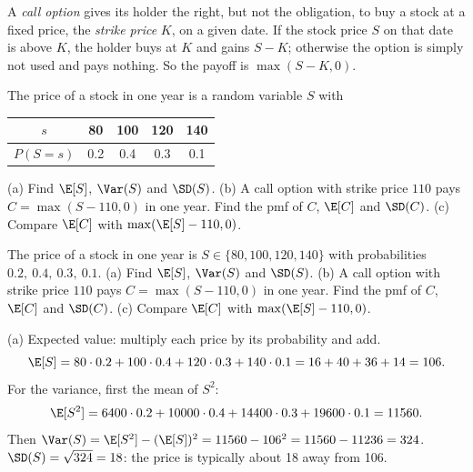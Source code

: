 
\begin{problem}
	\begin{context}
		A \emph{call option} gives its holder the right, but not the obligation,
		to buy a stock at a fixed price, the \emph{strike price} $K$, on a given
		date. If the stock price $S$ on that date is above $K$, the holder buys at
		$K$ and gains $S-K$; otherwise the option is simply not used and pays nothing. So the
		payoff is $\max(S-K,0)$.
	\end{context}
	The price of a stock in one year is a random variable $S$ with
	\begin{center}
		\begin{tabular}{c|cccc}
			$s$      & 80  & 100 & 120 & 140 \\\hline
			$P(S=s)$ & 0.2 & 0.4 & 0.3 & 0.1
		\end{tabular}
	\end{center}
	(a) Find $\E[S]$, $\Var(S)$ and $\SD(S)$.
	(b) A call option with strike price $110$ pays $C=\max(S-110,0)$ in one
	year. Find the pmf of $C$, $\E[C]$ and $\SD(C)$.
	(c) Compare $\E[C]$ with $\max(\E[S]-110,0)$.
\end{problem}

\begin{slideproblem}
	The price of a stock in one year is $S\in\{80,100,120,140\}$ with
	probabilities $0.2,\ 0.4,\ 0.3,\ 0.1$.
	(a) Find $\E[S]$, $\Var(S)$ and $\SD(S)$.
	(b) A call option with strike price $110$ pays $C=\max(S-110,0)$ in one
	year. Find the pmf of $C$, $\E[C]$ and $\SD(C)$.
	(c) Compare $\E[C]$ with $\max(\E[S]-110,0)$.
\end{slideproblem}

\begin{slides}
	\small
	\exstatement
	\pause
	\sol (a) Expected value: multiply each price by its probability and add.
	\[ \E[S]=80\cdot0.2+100\cdot0.4+120\cdot0.3+140\cdot0.1
		=16+40+36+14=106. \]
	\pause
	For the variance, first the mean of $S^2$:
	\[ \E[S^2]=6400\cdot0.2+10000\cdot0.4+14400\cdot0.3+19600\cdot0.1
		=11560. \]
	\pause
	Then $\Var(S)=\E[S^2]-(\E[S])^2=11560-106^2=11560-11236=324$.\\[1mm]
	\pause
	$\SD(S)=\sqrt{324}=18$: the price is typically about 18 away from 106.
\end{slides}

